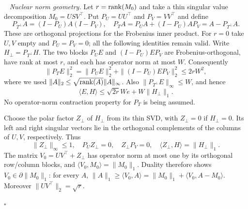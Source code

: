 \documentclass[12pt]{article}
\def\rank{\mathop{\rm rank}}
\newenvironment{pf}{{\noindent\it Proof}\ }{\hfill $\square$\par}
\begin{document}
\begin{pf}
\noindent\textit{Nuclear norm geometry.}
Let $r=\rank(M_0)$ and take a thin singular value decomposition
$M_0=USV^\top$. Put $P_U=UU^\top$ and $P_V=VV^\top$ and define
\[
 P_{T^\perp}A=(I-P_U)A(I-P_V),\quad
 P_TA=P_UA+(I-P_U)AP_V=A-P_{T^\perp}A.
\]
These are orthogonal projections for the Frobenius inner product.
For $r=0$ take $U,V$ empty and $P_U=P_V=0$; all the following
identities remain valid. Write $H_\perp=P_{T^\perp}H$.
The two blocks $P_UE$ and $(I-P_U)EP_V$ are Frobenius-orthogonal,
have rank at most $r$, and each has operator norm at most $W$.
Consequently
\begin{equation}\label{dmr:tangent-noise}
 \|P_TE\|_2^2=\|P_UE\|_2^2+\|(I-P_U)EP_V\|_2^2\le2rW^2,
\end{equation}
where we used $\|A\|_2\le\sqrt{\rank(A)}\|A\|_\infty$.
Also $\|P_{T^\perp}E\|_\infty\le W$, and hence
\begin{equation}\label{dmr:noise}
 \langle E,H\rangle
 \le\sqrt{2r}We+W\|H_\perp\|_1.
\end{equation}
No operator-norm contraction property for $P_T$ is being assumed.

Choose the polar factor $Z_\perp$ of $H_\perp$ from its thin SVD,
with $Z_\perp=0$ if $H_\perp=0$. Its left and right singular
vectors lie in the orthogonal complements of the columns of $U,V$,
respectively. Thus
\[
 \|Z_\perp\|_\infty\le1,\quad P_UZ_\perp=0,\quad
 Z_\perp P_V=0,\quad
 \langle Z_\perp,H\rangle=\|H_\perp\|_1.
\]
The matrix $V_0=UV^\top+Z_\perp$ has operator norm at most one
by its orthogonal row/column blocks, and
$\langle V_0,M_0\rangle=\|M_0\|_1$.
Duality therefore shows $V_0\in\partial\|M_0\|_1$:
for every $A$,
$\|A\|_1\ge\langle V_0,A\rangle
=\|M_0\|_1+\langle V_0,A-M_0\rangle$.
Moreover $\|UV^\top\|_2=\sqrt r$.


\end{pf}
\end{document}
